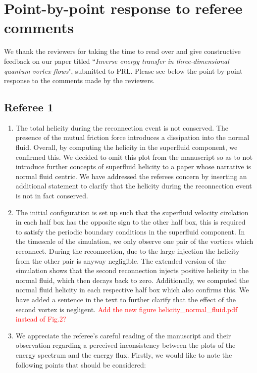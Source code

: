 \documentclass[a4paper,10pt]{article}
\def\red#1{\textcolor{red}{#1}}
\begin{document}
\section*{\centering Point-by-point response to referee comments}

We thank the reviewers for taking the time to read over and give constructive feedback on our paper titled “\emph{Inverse energy transfer in three-dimensional quantum vortex flows}", submitted to PRL. Please see below the point-by-point response to the comments made by the reviewers.

\subsection*{Referee 1}

\begin{enumerate}
    \item The total helicity during the reconnection event is not conserved. The presence of the mutual friction force introduces a dissipation into the normal fluid. Overall, by computing the helicity in the superfluid component, we confirmed this. We decided to omit this plot from the manuscript so as to not introduce further concepts of superfluid helicity to a paper whose narrative is normal fluid centric. We have addressed the referees concern by inserting an additional statement to clarify that the helicity during the reconnection event is not in fact conserved. 
    \item The initial configuration is set up such that the superfluid velocity circlation in each half box has the opposite sign to the other half box, this is required to satisfy the periodic boundary conditions in the superfluid component. In the timescale of the simulation, we only observe one pair of the vortices which reconnect. During the reconnection, due to the large injection the helicity from the other pair is anyway negligible. The extended version of the simulation shows that the second reconnection injects positive helicity in the normal fluid, which then decays back to zero. Additionally, we computed the normal fluid helicity in each respective half box which also confirms this. We have added a sentence in the text to further clarify that the effect of the second vortex is negligent. \red{Add the new figure helicity\_normal\_fluid.pdf instead of Fig.2?}
    \item We appreciate the referee’s careful reading of the manuscript and their observation regarding a perceived inconsistency between the plots of the energy spectrum and the energy flux. Firstly, we would like to note the following points that should be considered:

\end{enumerate}
\end{document}
